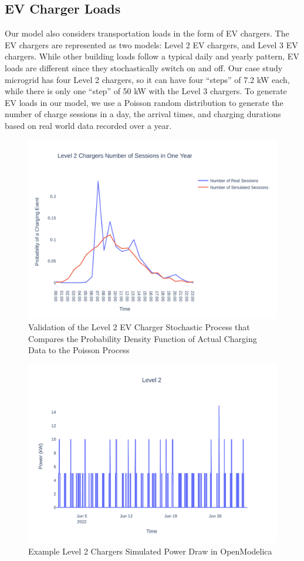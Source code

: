 \documentclass[conference]{IEEEtran}
\begin{document}
    \subsection{EV Charger Loads }
   		Our model also considers transportation loads in the form of EV chargers. The EV chargers are represented as two models: Level 2 EV chargers, and Level 3 EV chargers. While other building loads follow a typical daily and yearly pattern, EV loads are different since they stochastically switch on and off. Our case study microgrid has four Level 2 chargers, so it can have four ``steps'' of 7.2 kW each, while there is only one ``step'' of 50 kW with the Level 3 chargers. To generate EV loads in our model, we use a Poisson random distribution to generate the number of charge sessions in a day, the arrival times, and charging durations based on real world data recorded over a year. 
		\begin{figure}
			\centering
			\includegraphics[width=0.9\linewidth]{Fig/l2_avg_day_rand_poisson_1_hour_pdf}
			\caption{\footnotesize Validation of the Level 2 EV Charger Stochastic Process that Compares the Probability Density Function of Actual Charging Data to the Poisson Process}
			\label{fig:l2avgdayrandpoisson1hourpdf}
		\end{figure}
		\begin{figure}
			\centering
			\includegraphics[width=0.9\linewidth]{Fig/l2_g_pad_poisson_June}
			\caption{\footnotesize  Example Level 2 Chargers Simulated Power Draw in OpenModelica}
			\label{fig:l2gpadpoissonjune}
		\end{figure}
\end{document}
